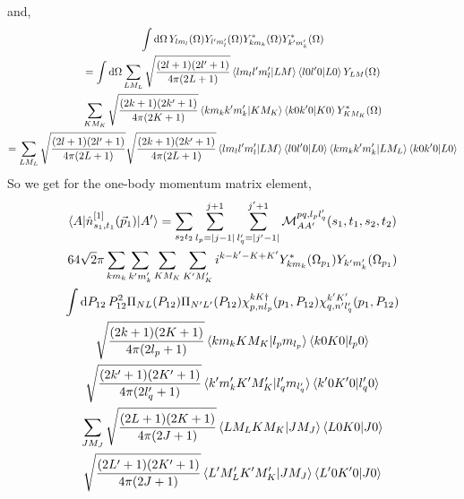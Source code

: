 \documentclass[10pt]{article}
\begin{document}
and,
\begin{multline*}
	\int \text{d} \Omega \, Y_{ l m_l }(\Omega) Y_{ l' m_l'}(\Omega) Y_{ k m_k}^{*}(\Omega) Y_{ k' m_k'}^{*}(\Omega) \\
	= \int \text{d} \Omega \sum_{LM_L} \sqrt{ \frac{(2l+1)(2l'+1)}{4 \pi (2L+1)}} \braket{ l m_l l' m_l' | L M} \braket{ l 0 l' 0 | L 0 } Y_{L M}(\Omega) \\
	 \sum_{K M_K} \sqrt{ \frac{(2k+1)(2k'+1)}{4 \pi (2K+1)}} \braket{ k m_k k' m_k' | K M_K} \braket{ k 0 k' 0 | K 0 } Y_{K M_K}^{*}(\Omega) \\
	 = \sum_{LM_L} \sqrt{ \frac{(2l+1)(2l'+1)}{4 \pi (2L+1)}} \sqrt{ \frac{(2k+1)(2k'+1)}{4 \pi (2L+1)}} \braket{ l m_l l' m_l' | L M} \braket{ l 0 l' 0 | L 0 } \braket{ k m_k k' m_k' | L M_L} \braket{ k 0 k' 0 | L 0 } 
\end{multline*}
So we get for the one-body momentum matrix element,
\begin{multline*}
\braket{ A | \hat{n}_{s_1,t_1}^{[1]}(\vec{p}_1) | A'} = \sum_{s_2 t_2}  \sum_{l_p = |j-1|}^{j+1} \sum_{l_q' = |j' - 1|}^{j'+1} \mathcal{M}_{AA'}^{p q,l_p l_q'}(s_1,t_1,s_2,t_2) \\
 64 \sqrt{2} \pi \sum_{k m_k} \sum_{k' m_k'} \sum_{K M_K} \sum_{K' M_K'} i^{k-k'-K+K'} Y_{k m_k}^{*}(\Omega_{p_1}) Y_{k' m_k'}(\Omega_{p_1}) \\
 \int \text{d} P_{12} \, P_{12}^{2} \Pi_{N L}(P_{12}) \Pi_{N' L'}(P_{12}) \chi_{p,nl_p}^{kK\dagger}(p_1,P_{12}) \chi_{q,n'l_q'}^{k'K'}(p_1,P_{12}) \\
    \sqrt{ \frac{(2 k + 1)(2 K+1)}{4 \pi (2 l_p +1 )}} \braket{ k m_k K M_K | l_p m_{l_p}} \braket{ k 0 K 0 | l_p 0} \\
    \sqrt{ \frac{(2 k' + 1)(2 K'+1)}{4 \pi (2 l_q' +1 )}} \braket{ k' m_k' K' M_K' | l_q' m_{l_q'}} \braket{ k' 0 K' 0 | l_q' 0} \\
    \sum_{J M_J} \sqrt{ \frac{ (2L+1)(2K+1)}{ 4 \pi (2 J+1)} } \braket{ L M_L K M_K | J M_J} \braket{ L 0 K 0 | J 0 } \\ \sqrt{ \frac{ (2L'+1)(2K'+1)}{ 4 \pi (2 J+1)} } \braket{L' M_L' K' M_K' | J M_J } \braket{ L' 0 K' 0 | J 0 } \\ 
\end{multline*}
\end{document}
